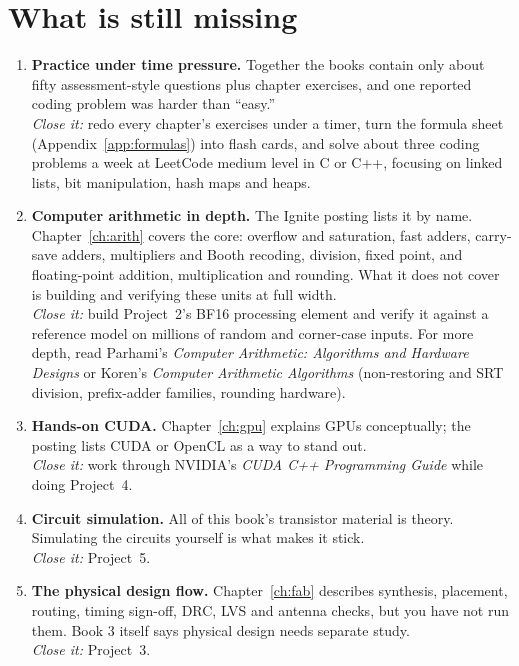 \section{What is still missing}
\label{sec:gaps}

\begin{enumerate}
  \item \textbf{Practice under time pressure.} Together the books contain only about fifty assessment-style questions plus chapter exercises, and one reported coding problem was harder than ``easy.''\\
  \emph{Close it:} redo every chapter's exercises under a timer, turn the formula sheet (Appendix~\ref{app:formulas}) into flash cards, and solve about three coding problems a week at LeetCode medium level in C or C++, focusing on linked lists, bit manipulation, hash maps and heaps.

  \item \textbf{Computer arithmetic in depth.} The Ignite posting lists it by name. Chapter~\ref{ch:arith} covers the core: overflow and saturation, fast adders, carry-save adders, multipliers and Booth recoding, division, fixed point, and floating-point addition, multiplication and rounding. What it does not cover is building and verifying these units at full width.\\
  \emph{Close it:} build Project~2's BF16 processing element and verify it against a reference model on millions of random and corner-case inputs. For more depth, read Parhami's \emph{Computer Arithmetic: Algorithms and Hardware Designs} or Koren's \emph{Computer Arithmetic Algorithms} (non-restoring and SRT division, prefix-adder families, rounding hardware).

  \item \textbf{Hands-on CUDA.} Chapter~\ref{ch:gpu} explains GPUs conceptually; the posting lists CUDA or OpenCL as a way to stand out.\\
  \emph{Close it:} work through NVIDIA's \emph{CUDA C++ Programming Guide} while doing Project~4.

  \item \textbf{Circuit simulation.} All of this book's transistor material is theory. Simulating the circuits yourself is what makes it stick.\\
  \emph{Close it:} Project~5.

  \item \textbf{The physical design flow.} Chapter~\ref{ch:fab} describes synthesis, placement, routing, timing sign-off, DRC, LVS and antenna checks, but you have not run them. Book 3 itself says physical design needs separate study.\\
  \emph{Close it:} Project~3.


\end{enumerate}
